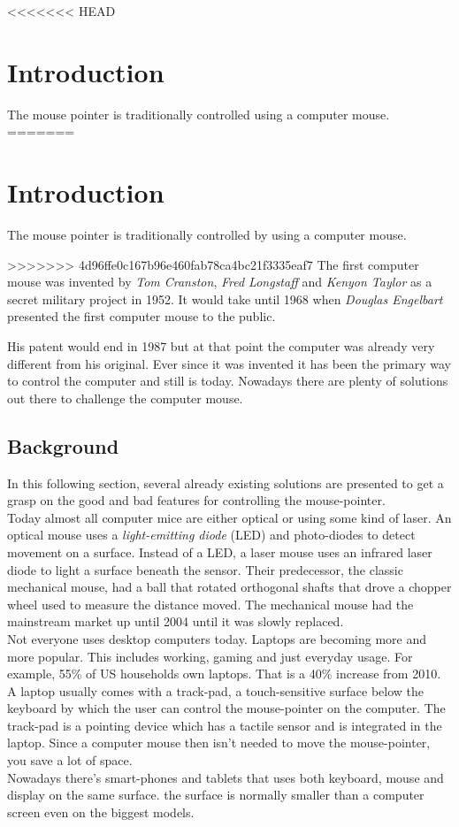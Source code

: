 <<<<<<< HEAD
﻿\chapter{Introduction}
The mouse pointer is traditionally controlled using a computer mouse.
=======
\chapter{Introduction}
The mouse pointer is traditionally controlled by using a computer mouse.

>>>>>>> 4d96ffe0c167b96e460fab78ca4bc21f3335eaf7
The first computer mouse was invented by \emph{Tom Cranston}, \emph{Fred Longstaff} and 
\emph{Kenyon Taylor} as a secret military project in 1952. It would take until 
1968 when \emph{Douglas Engelbart} presented the first computer mouse to the public.

His patent would end in 1987 but at that point the  computer was already very different from his original. Ever since
it was invented it has been the primary way to control the computer and still is today. Nowadays
there are plenty of solutions out there to challenge the computer mouse.\cite{Mouse40} \cite{Pioneers}

\section{Background}
In this following section, several already existing solutions are presented to get a 
grasp on the good and bad features for controlling the mouse-pointer.\\
Today almost all computer mice are either optical or using some kind of laser. An optical
mouse uses a \emph{light-emitting diode} (LED) and photo-diodes to detect movement on a
surface. Instead of a LED, a laser mouse uses an infrared laser diode to light a surface
beneath the sensor. Their predecessor, the classic mechanical mouse, had a ball that rotated
orthogonal shafts that drove a chopper wheel used to measure the distance moved. The mechanical
mouse had the mainstream market up until 2004 until it was slowly replaced.\\
Not everyone uses desktop computers today. Laptops are becoming more and more popular.
This includes working, gaming and just everyday usage. For example, 55\% of US households
own laptops. That is a 40\% increase from 2010.\\
A laptop usually comes with a track-pad, a touch-sensitive surface below the keyboard
by which the user can control the mouse-pointer on the computer.
The track-pad is a pointing device which has a tactile sensor and is
integrated in the laptop. Since a computer mouse then isn't needed to move
the mouse-pointer, you save a lot of space.\\
Nowadays there's smart-phones and tablets that uses both keyboard, mouse
and display on the same surface. the surface is normally smaller than a computer screen
even on the biggest models.

